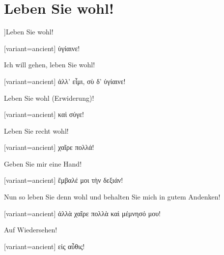 \section{Leben Sie wohl!}

]\indent Leben Sie wohl!

\switchcolumn

\begin{greek}[variant=ancient]%
ὑγίαινε!

\end{greek}%
\switchcolumn*

Ich will gehen, leben Sie wohl!

\switchcolumn

\begin{greek}[variant=ancient]%
ἀλλ' εἶμι, σὺ δ' ὑγίαινε!

\end{greek}%
\switchcolumn*

Leben Sie wohl (Erwiderung)!

\switchcolumn

\begin{greek}[variant=ancient]%
καὶ σύγε!

\end{greek}%
\switchcolumn*

Leben Sie recht wohl!

\switchcolumn

\begin{greek}[variant=ancient]%
χαῖρε πολλά!

\end{greek}%
\switchcolumn*

Geben Sie mir eine Hand!

\switchcolumn

\begin{greek}[variant=ancient]%
ἔμβαλέ μοι τὴν δεξιάν!

\end{greek}%
\switchcolumn*

Nun so leben Sie denn wohl und behalten Sie mich in gutem Andenken!

\switchcolumn

\begin{greek}[variant=ancient]%
ἀλλὰ χαῖρε πολλὰ καὶ μέμνησό μου!

\end{greek}%
\switchcolumn*

Auf Wiedersehen!

\switchcolumn

\begin{greek}[variant=ancient]%
εἰς αὖθις!

\end{greek}%
\switchcolumn*

